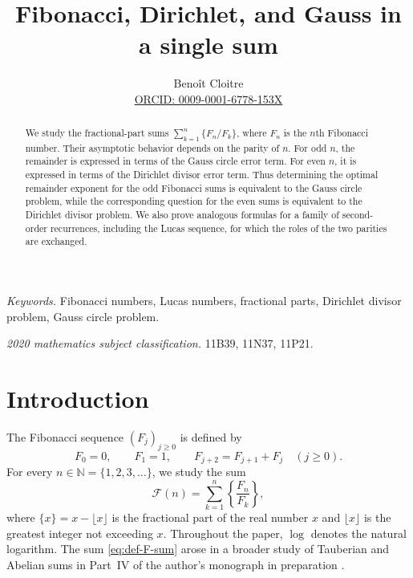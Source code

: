 \documentclass[11pt]{article}
\title{Fibonacci, Dirichlet, and Gauss in a single sum}
\author{Beno\^it Cloitre\\[2pt]
\small\href{https://orcid.org/0009-0001-6778-153X}{ORCID: 0009-0001-6778-153X}}
\date{}
\newcommand{\FF}{\mathcal F}
\begin{document}
\maketitle

\begin{abstract}
We study the fractional-part sums $\sum_{k=1}^{n}\{F_n/F_k\}$, where $F_n$
is the $n$th Fibonacci number. Their asymptotic behavior depends on the
parity of $n$. For odd $n$, the remainder is expressed in terms of the
Gauss circle error term. For even $n$, it is expressed in terms of the
Dirichlet divisor error term. Thus determining the optimal remainder exponent
for the odd Fibonacci sums is equivalent to the Gauss circle problem, while
the corresponding question for the even sums is equivalent to the Dirichlet
divisor problem. We also prove analogous formulas for a family of second-order
recurrences, including the Lucas sequence, for which the roles of the two
parities are exchanged.
\end{abstract}

\noindent
\emph{Keywords.} Fibonacci numbers, Lucas numbers, fractional parts,
Dirichlet divisor problem, Gauss circle problem.

\smallskip
\noindent
\emph{2020 mathematics subject classification.} 11B39, 11N37, 11P21.

\section{Introduction}

The Fibonacci sequence $(F_j)_{j\geq 0}$ is defined by
\[
 F_0=0,\qquad F_1=1,\qquad F_{j+2}=F_{j+1}+F_j
 \quad (j\geq 0).
\]
For every $n\in\mathbb N=\{1,2,3,\ldots\}$, we study the sum
\begin{equation}\label{eq:def-F-sum}
 \FF(n)=\sum_{k=1}^{n}\left\{\frac{F_n}{F_k}\right\},
\end{equation}
where $\{x\}=x-\lfloor x\rfloor$ is the fractional part of the real
number $x$ and $\lfloor x\rfloor$ is the greatest integer not exceeding
$x$. Throughout the paper, $\log$ denotes the natural logarithm. The sum
\eqref{eq:def-F-sum} arose in a broader study of Tauberian and Abelian
sums in Part~IV of the author's monograph in preparation \cite{CloitreRAF}.
\end{document}
